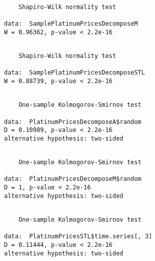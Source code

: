 \documentclass[11pt]{article}
\begin{document}
    \begin{verbatim}

	Shapiro-Wilk normality test

data:  SamplePlatinumPricesDecomposeM
W = 0.96362, p-value < 2.2e-16

    \end{verbatim}

    
    
    \begin{verbatim}

	Shapiro-Wilk normality test

data:  SamplePlatinumPricesDecomposeSTL
W = 0.88739, p-value < 2.2e-16

    \end{verbatim}

    
    
    \begin{verbatim}

	One-sample Kolmogorov-Smirnov test

data:  PlatinumPricesDecomposeA$random
D = 0.10989, p-value < 2.2e-16
alternative hypothesis: two-sided

    \end{verbatim}

    
    
    \begin{verbatim}

	One-sample Kolmogorov-Smirnov test

data:  PlatinumPricesDecomposeM$random
D = 1, p-value < 2.2e-16
alternative hypothesis: two-sided

    \end{verbatim}

    
    
    \begin{verbatim}

	One-sample Kolmogorov-Smirnov test

data:  PlatinumPricesSTL$time.series[, 3]
D = 0.11444, p-value < 2.2e-16
alternative hypothesis: two-sided

    \end{verbatim}
\end{document}

